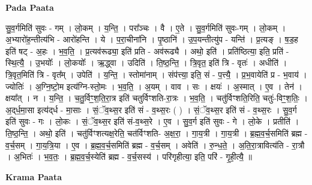 \documentclass[17pt]{extarticle}
\begin{document}
\textbf{Pada Paata} \newline

सु॒व॒र्गमिति॑ सुवः - गम् । लो॒कम् । य॒न्ति॒ । परा᳚ञ्चः । वै । ए॒ते । सु॒व॒र्गमिति॑ सुवः-गम् । लो॒कम् । अ॒भ्यारो॑ह॒न्तीत्य॑भि - आरो॑हन्ति । ये । प॒रा॒चीना॑नि । पृ॒ष्ठानि॑ । उ॒प॒यन्तीत्यु॑प - यन्ति॑ । प्र॒त्यङ् । ष॒ड॒ह इति॑ षट् - अ॒हः । भ॒व॒ति॒ । प्र॒त्यव॑रूढ्या॒ इति॑ प्रति - अव॑रूढ्यै । अथो॒ इति॑ । प्रति॑ष्ठित्या॒ इति॒ प्रति॑ - स्थि॒त्यै॒ । उ॒भयोः᳚ । लो॒कयोः᳚ । ऋ॒द्ध्वा । उदिति॑ । ति॒ष्ठ॒न्ति॒ । त्रि॒वृत॒ इति॑ त्रि - वृतः॑ । अधीति॑ । त्रि॒वृत॒मिति॑ त्रि - वृत᳚म् । उपेति॑ । य॒न्ति॒ । स्तोमा॑नाम् । संप॑त्त्या॒ इति॒ सं - प॒त्त्यै॒ । प्र॒भ॒वायेति॑ प्र - भ॒वाय॑ । ज्योतिः॑ । अ॒ग्नि॒ष्टो॒म इत्य॑ग्नि-स्तो॒मः । भ॒व॒ति॒ । अ॒यम् । वाव । सः । क्षयः॑ । अ॒स्मात् । ए॒व । तेन॑ । क्षया᳚त् । न । य॒न्ति॒ । च॒तु॒र्विꣳ॒॒श॒ति॒रा॒त्र इति॑ चतुर्विꣳशति-रा॒त्रः । भ॒व॒ति॒ । चतु॑र्विꣳशति॒रिति॒ चतुः॑-विꣳ॒॒श॒तिः॒ । अ॒द्‌र्ध॒मा॒सा इत्य॑द्‌र्ध - मा॒साः । सं॒ॅव॒थ्स॒र इति॑ सं - व॒थ्स॒रः ( ) । सं॒ॅव॒थ्स॒र इति॑ सं - व॒थ्स॒रः । सु॒व॒र्ग इति॑ सुवः - गः । लो॒कः । सं॒ॅव॒थ्स॒र इति॑ सं-व॒थ्स॒रे । ए॒व । सु॒व॒र्ग इति॑ सुवः - गे । लो॒के । प्रतीति॑ । ति॒ष्ठ॒न्ति॒ । अथो॒ इति॑ । चतु॑र्विꣳशत्यक्ष॒रेति॒ चत॑र्विꣳशति- अ॒क्ष॒रा॒ । गा॒य॒त्री । गा॒य॒त्री । ब्र॒ह्म॒व॒र्च॒समिति॑ ब्रह्म - व॒र्च॒सम् । गा॒य॒त्रि॒या । ए॒व । ब्र॒ह्म॒व॒र्च॒समिति॑ ब्रह्म - व॒र्च॒सम् । अवेति॑ । रु॒न्ध॒ते॒ । अ॒ति॒रा॒त्रावित्य॑ति - रा॒त्रौ । अ॒भितः॑ । भ॒व॒तः॒ । ब्र॒ह्म॒व॒र्च॒स्येति॑ ब्रह्म - व॒र्च॒सस्य॑ । परि॑गृहीत्या॒ इति॒ परि॑ - गृ॒ही॒त्यै॒ ॥  \newline


\textbf{Krama Paata} \newline
\end{document}
